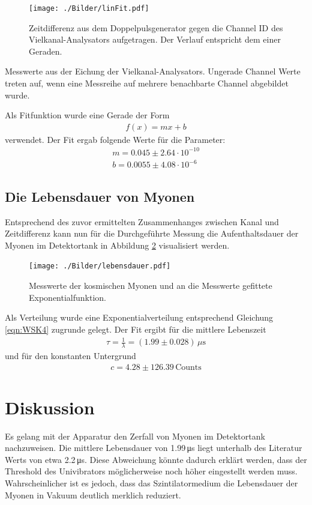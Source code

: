 \begin{figure}[H]
	\texttt{[image: ./Bilder/linFit.pdf]}
	\caption{Zeitdifferenz aus dem Doppelpulsgenerator gegen die Channel ID des Vielkanal-Analysators aufgetragen. Der Verlauf entspricht dem einer Geraden.}
	\label{fig:linFit}
\end{figure}

\begin{table}[htbp]
	
	\caption{Messwerte aus der Eichung der Vielkanal-Analysators. Ungerade Channel Werte treten auf, wenn eine Messreihe auf mehrere benachbarte Channel abgebildet wurde.}
	\label{tab:linFit}
\end{table}


Als Fitfunktion wurde eine Gerade der Form
\begin{align}
	f(x) = mx + b
\end{align}
verwendet. Der Fit ergab folgende Werte für die Parameter:
\begin{align}
	m = 0.045 \pm 2.64\cdot10^{-10}\\
	b = 0.0055 \pm 4.08 \cdot 10^{-6}
\end{align}

\subsection{Die Lebensdauer von Myonen}
Entsprechend des zuvor ermittelten Zusammenhanges zwischen Kanal und Zeitdifferenz kann nun für die Durchgeführte Messung die Aufenthaltsdauer der Myonen im Detektortank in Abbildung \ref{fig:lebensdauer} visualisiert werden.

\begin{figure}[htbp]
	\texttt{[image: ./Bilder/lebensdauer.pdf]}
	\caption{Messwerte der kosmischen Myonen und an die Messwerte gefittete Exponentialfunktion.}
	\label{fig:lebensdauer}
\end{figure}

Als Verteilung wurde eine Exponentialverteilung entsprechend Gleichung \ref{eqn:WSK4} zugrunde gelegt. Der Fit ergibt für die mittlere Lebenszeit
\begin{align}
	\tau = \frac{1}{\lambda} = (1.99 \pm 0.028)\,\text{$\mu$s}
\end{align}
und für den konstanten Untergrund
\begin{align}
c = 4.28 \pm 126.39\,\text{Counts}
\end{align}

\section{Diskussion}
Es gelang mit der Apparatur den Zerfall von Myonen im Detektortank nachzuweisen. Die mittlere Lebensdauer von 1.99\,\si{\micro \second} liegt unterhalb des Literatur Werts von etwa 2.2\,\si{\micro\second}. Diese Abweichung könnte dadurch erklärt werden, dass der Threshold des Univibrators möglicherweise noch höher eingestellt werden muss. Wahrscheinlicher ist es jedoch, dass das Szintilatormedium die Lebensdauer der Myonen in Vakuum deutlich merklich reduziert.


